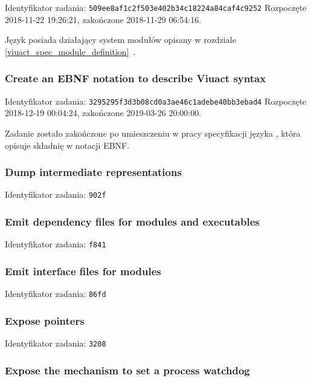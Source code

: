 Identyfikator zadania: \texttt{509ee8af1c2f503e402b34c18224a84caf4c9252}
\newline
Rozpoczęte 2018-11-22 19:26:21, zakończone 2018-11-29 06:54:16.
\newline

Język \ViuAct\phantom{} posiada działający system modułów opisany w rozdziale
\ref{viuact_spec_module_definition}~.

\subsubsection{Create an EBNF notation to describe Viuact syntax}

Identyfikator zadania: \texttt{3295295f3d3b08cd0a3ae46c1adebe40bb3ebad4}
\newline
Rozpoczęte 2018-12-19 00:04:24, zakończone 2019-03-26 20:00:00.

Zadanie zostało zakończone po umieszczeniu w pracy specyfikacji języka \ViuAct,
która opisuje składnię w notacji EBNF.

\subsubsection{Dump intermediate representations}

Identyfikator zadania: \texttt{902f}

\subsubsection{Emit dependency files for modules and executables}

Identyfikator zadania: \texttt{f841}

\subsubsection{Emit interface files for modules}

Identyfikator zadania: \texttt{86fd}

\subsubsection{Expose pointers}

Identyfikator zadania: \texttt{3208}

\subsubsection{Expose the mechanism to set a process watchdog}

